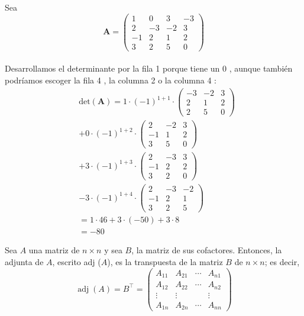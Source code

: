 \begin{example}
Sea  $$\boldsymbol{A}=\left(\begin{array}{rrrr}
1 & 0 & 3 & -3 \\
2 & -3 & -2 & 3 \\
-1 & 2 & 1 & 2 \\
3 & 2 & 5 & 0
\end{array}\right) $$\\
Desarrollamos el determinante por la fila 1 porque tiene un 0 , aunque también podríamos escoger la fila 4 , la columna 2 o la columna 4 :
$$
\begin{aligned}
&\text{det}(\boldsymbol{A}) =1 \cdot(-1)^{1+1} \cdot\left(\begin{array}{ccc}
-3 & -2 & 3 \\
2 & 1 & 2 \\
2 & 5 & 0
\end{array}\right) \\
& +0 \cdot(-1)^{1+2} \cdot\left(\begin{array}{ccc}
2 & -2 & 3 \\
-1 & 1 & 2 \\
3 & 5 & 0
\end{array}\right) \\
& +3 \cdot(-1)^{1+3} \cdot\left(\begin{array}{ccc}
2 & -3 & 3 \\
-1 & 2 & 2 \\
3 & 2 & 0
\end{array}\right) \\
& -3 \cdot(-1)^{1+4} \cdot\left(\begin{array}{ccc}
2 & -3 & -2 \\
-1 & 2 & 1 \\
3 & 2 & 5
\end{array}\right) \\
& =1 \cdot 46 +3 \cdot(-50)+3 \cdot 8\\
& =-80
\end{aligned}
$$
\end{example}
\begin{definition}
Sea $A$ una matriz de $n \times n$ y sea $B$,  la matriz de sus cofactores. Entonces, la adjunta de $A$, escrito adj ($A$), es la transpuesta de la matriz $B$ de $n \times n$; es decir,
$$\operatorname{adj} (A)=B^{\top}=\left(\begin{array}{cccc}A_{11} & A_{21} & \cdots & A_{n 1} \\ A_{12} & A_{22} & \cdots & A_{n 2} \\ \vdots & \vdots & & \vdots \\ A_{1 n} & A_{2 n} & \cdots & A_{n n}\end{array}\right)$$    
\end{definition}
